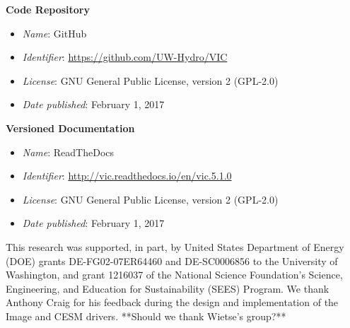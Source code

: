 \documentclass[gmd, manuscript]{copernicus}
\begin{document}
{\bf Code Repository}

\begin{itemize}
	\item \textit{Name}: GitHub
	\item \textit{Identifier}: \url{https://github.com/UW-Hydro/VIC}
	\item \textit{License}: GNU General Public License, version 2 (GPL-2.0)
	\item \textit{Date published}: February 1, 2017
\end{itemize}

{\bf Versioned Documentation}

\begin{itemize}
	\item \textit{Name}: ReadTheDocs
	\item \textit{Identifier}: \url{http://vic.readthedocs.io/en/vic.5.1.0}
	\item \textit{License}: GNU General Public License, version 2 (GPL-2.0)
	\item \textit{Date published}: February 1, 2017
\end{itemize}



\begin{acknowledgements}
  This research was supported, in part, by United States Department of Energy (DOE) grants DE-FG02-07ER64460 and DE-SC0006856 to the University of Washington, and grant 1216037 of the National Science Foundation's Science, Engineering, and Education for Sustainability (SEES) Program. We thank Anthony Craig for his feedback during the design and implementation of the Image and CESM drivers. **Should we thank Wietse's group?**
\end{acknowledgements}




%
%
%
\end{document}
